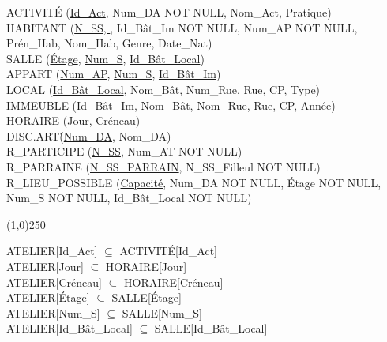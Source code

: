 \documentclass[a4paper,10.5pt]{report}
\begin{document}
	ACTIVITÉ (\underline{Id\_Act}, Num\_DA NOT NULL, Nom\_Act, Pratique) \\

	HABITANT (\underline{N\_SS, }, Id\_Bât\_Im NOT NULL, Num\_AP NOT NULL, Prén\_Hab, Nom\_Hab, Genre, Date\_Nat)  \\

	SALLE (\underline{Étage}, \underline{Num\_S}, \underline{Id\_Bât\_Local}) \\

	APPART (\underline{Num\_AP}, \underline{Num\_S}, \underline{Id\_Bât\_Im}) \\

	LOCAL (\underline{Id\_Bât\_Local}, Nom\_Bât, Num\_Rue, Rue, CP, Type) \\

	IMMEUBLE (\underline{Id\_Bât\_Im}, Nom\_Bât, Nom\_Rue, Rue, CP, Année) \\

	HORAIRE (\underline{Jour}, \underline{Créneau}) \\

	DISC.ART\. (\underline{Num\_DA}, Nom\_DA) \\

	R\_PARTICIPE (\underline{N\_SS}, Num\_AT NOT NULL) \\

	R\_PARRAINE (\underline{N\_SS\_PARRAIN}, N\_SS\_Filleul NOT NULL) \\

	R\_LIEU\_POSSIBLE (\underline{Capacité}, Num\_DA NOT NULL, Étage NOT NULL, Num\_S NOT NULL, Id\_Bât\_Local NOT NULL)

	\begin{center}
	\line(1,0){250}
	\end{center}

	ATELIER[Id\_Act] $\subseteq$ ACTIVITÉ[Id\_Act] \\

	ATELIER[Jour] $\subseteq$ HORAIRE[Jour] \\

	ATELIER[Créneau] $\subseteq$ HORAIRE[Créneau] \\

	ATELIER[Étage] $\subseteq$ SALLE[Étage] \\

	ATELIER[Num\_S] $\subseteq$ SALLE[Num\_S] \\

	ATELIER[Id\_Bât\_Local] $\subseteq$ SALLE[Id\_Bât\_Local] \\
\end{document}

